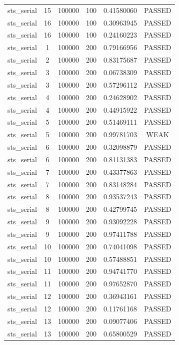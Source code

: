 \begin{longtable}{cccccc}
sts\_serial & 15 & 100000 & 100 & 0.41580060 & PASSED \\
sts\_serial & 16 & 100000 & 100 & 0.30963945 & PASSED \\
sts\_serial & 16 & 100000 & 100 & 0.24160223 & PASSED \\
sts\_serial & 1 & 100000 & 200 & 0.79166956 & PASSED \\
sts\_serial & 2 & 100000 & 200 & 0.83175687 & PASSED \\
sts\_serial & 3 & 100000 & 200 & 0.06738309 & PASSED \\
sts\_serial & 3 & 100000 & 200 & 0.57296112 & PASSED \\
sts\_serial & 4 & 100000 & 200 & 0.24628902 & PASSED \\
sts\_serial & 4 & 100000 & 200 & 0.44915922 & PASSED \\
sts\_serial & 5 & 100000 & 200 & 0.51469111 & PASSED \\
sts\_serial & 5 & 100000 & 200 & 0.99781703 & WEAK \\
sts\_serial & 6 & 100000 & 200 & 0.32098879 & PASSED \\
sts\_serial & 6 & 100000 & 200 & 0.81131383 & PASSED \\
sts\_serial & 7 & 100000 & 200 & 0.43377863 & PASSED \\
sts\_serial & 7 & 100000 & 200 & 0.83148284 & PASSED \\
sts\_serial & 8 & 100000 & 200 & 0.93537243 & PASSED \\
sts\_serial & 8 & 100000 & 200 & 0.42799745 & PASSED \\
sts\_serial & 9 & 100000 & 200 & 0.93092228 & PASSED \\
sts\_serial & 9 & 100000 & 200 & 0.97411788 & PASSED \\
sts\_serial & 10 & 100000 & 200 & 0.74041098 & PASSED \\
sts\_serial & 10 & 100000 & 200 & 0.57488851 & PASSED \\
sts\_serial & 11 & 100000 & 200 & 0.94741770 & PASSED \\
sts\_serial & 11 & 100000 & 200 & 0.97652870 & PASSED \\
sts\_serial & 12 & 100000 & 200 & 0.36943161 & PASSED \\
sts\_serial & 12 & 100000 & 200 & 0.11761168 & PASSED \\
sts\_serial & 13 & 100000 & 200 & 0.09077406 & PASSED \\
sts\_serial & 13 & 100000 & 200 & 0.65800529 & PASSED \\

\end{longtable}
